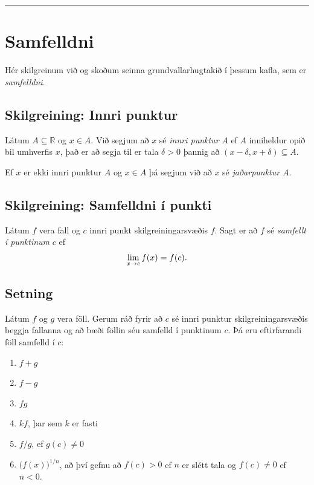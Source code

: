 \documentclass[b5paper,10pt,icelandic]{sphinxmanual}
\begin{document}

\bigskip\hrule{}\bigskip



\section{Samfelldni}
\label{kafli02:id11}\label{kafli02:samfelldni}
Hér skilgreinum við og skoðum seinna grundvallarhugtakið í þessum kafla, sem er \textit{samfelldni}.


\subsection{Skilgreining: Innri punktur}
\label{kafli02:index-7}\label{kafli02:skilgreining-innri-punktur}
Látum \(A\subseteq {{\mathbb  R}}\) og \(x\in A\). Við segjum að
\(x\) sé \textit{innri punktur} \(A\) ef \(A\) inniheldur opið bil
umhverfis \(x\), það er að segja til er tala \(\delta>0\) þannig
að \((x-\delta, x+\delta)\subseteq
A\).

Ef \(x\) er ekki innri punktur \(A\) og \(x\in A\) þá segjum
við að \(x\) sé \textit{jaðarpunktur} \(A\).


\subsection{Skilgreining: Samfelldni í punkti}
\label{kafli02:index-8}\label{kafli02:skilgreining-samfelldni-i-punkti}
Látum \(f\) vera fall og \(c\) innri punkt skilgreiningarsvæðis
\(f\). Sagt er að \(f\) sé \emph{samfellt í punktinum} \(c\) ef
\begin{gather}
\begin{split}\lim_{x\rightarrow c}f(x)=f(c).\end{split}\notag
\end{gather}

\subsection{Setning}
\label{kafli02:id12}
Látum \(f\) og \(g\) vera föll. Gerum ráð fyrir að \(c\) sé
innri punktur skilgreiningarsvæðis beggja fallanna og að bæði föllin séu
samfelld í punktinum \(c\). Þá eru eftirfarandi föll samfelld í
\(c\):
\begin{enumerate}
\item {} 
\(f+g\)

\item {} 
\(f-g\)

\item {} 
\(fg\)

\item {} 
\(kf\), þar sem \(k\) er fasti

\item {} 
\(f/g\), ef \(g(c)\neq 0\)

\item {} 
\(\Big(f(x)\Big)^{1/n}\), að því gefnu að \(f(c)>0\) ef
\(n\) er slétt tala og \(f(c)\neq 0\) ef \(n<0\).

\end{enumerate}
\end{document}

